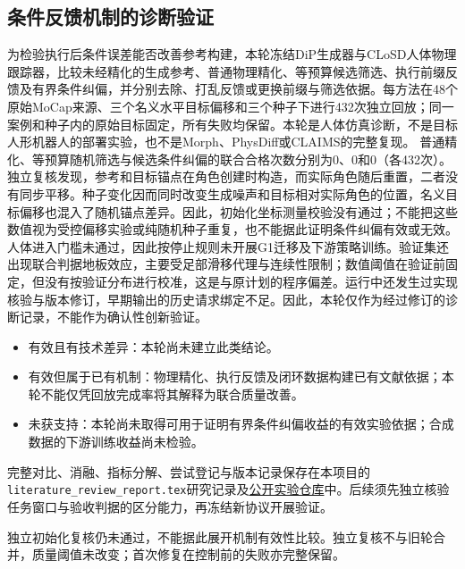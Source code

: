 \subsection{条件反馈机制的诊断验证}
\label{sec:physics-guided-diagnostic-status}
为检验执行后条件误差能否改善参考构建，本轮冻结DiP生成器与CLoSD人体物理跟踪器，比较未经精化的生成参考、普通物理精化、等预算候选筛选、执行前缀反馈及有界条件纠偏，并分别去除、打乱反馈或更换前缀与筛选依据。每方法在48个原始MoCap来源、三个名义水平目标偏移和三个种子下进行432次独立回放；同一案例和种子内的原始目标固定，所有失败均保留。本轮是人体仿真诊断，不是目标人形机器人的部署实验，也不是Morph、PhysDiff或CLAIMS的完整复现。
普通精化、等预算随机筛选与候选条件纠偏的联合合格次数分别为0、0和0（各432次）。独立复核发现，参考和目标锚点在角色创建时构造，而实际角色随后重置，二者没有同步平移。种子变化因而同时改变生成噪声和目标相对实际角色的位置，名义目标偏移也混入了随机锚点差异。因此，初始化坐标测量校验没有通过；不能把这些数值视为受控偏移实验或纯随机种子重复，也不能据此证明条件纠偏有效或无效。
人体进入门槛未通过，因此按停止规则未开展G1迁移及下游策略训练。验证集还出现联合判据地板效应，主要受足部滑移代理与连续性限制；数值阈值在验证前固定，但没有按验证分布进行校准，这是与原计划的程序偏差。运行中还发生过实现核验与版本修订，早期输出的历史请求绑定不足。因此，本轮仅作为经过修订的诊断记录，不能作为确认性创新验证。
\begin{itemize}
\item 有效且有技术差异：本轮尚未建立此类结论。
\item 有效但属于已有机制：物理精化、执行反馈及闭环数据构建已有文献依据\citep{closd,parc,claims}；本轮不能仅凭回放完成率将其解释为联合质量改善。
\item 未获支持：本轮尚未取得可用于证明有界条件纠偏收益的有效实验依据；合成数据的下游训练收益尚未检验。
\end{itemize}
完整对比、消融、指标分解、尝试登记与版本记录保存在本项目的\texttt{literature\_review\_report.tex}研究记录及\href{https://github.com/Pendragon08/conditional-human-motion-generation}{公开实验仓库}中。后续须先独立核验任务窗口与验收判据的区分能力，再冻结新协议开展验证。

独立初始化复核仍未通过，不能据此展开机制有效性比较。独立复核不与旧轮合并，质量阈值未改变；首次修复在控制前的失败亦完整保留。

